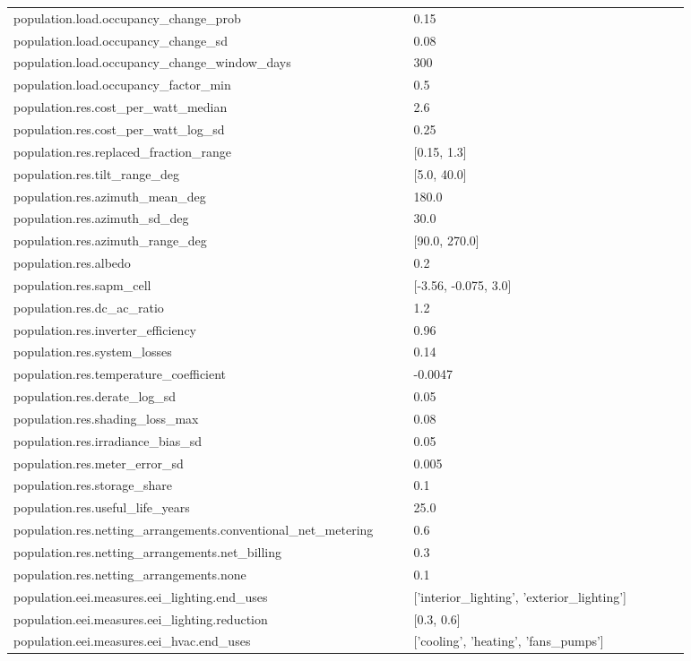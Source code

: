 \begin{longtable}{p{0.55\linewidth}p{0.38\linewidth}}
population.load.occupancy\_change\_prob & 0.15 \\
population.load.occupancy\_change\_sd & 0.08 \\
population.load.occupancy\_change\_window\_days & 300 \\
population.load.occupancy\_factor\_min & 0.5 \\
population.res.cost\_per\_watt\_median & 2.6 \\
population.res.cost\_per\_watt\_log\_sd & 0.25 \\
population.res.replaced\_fraction\_range & [0.15, 1.3] \\
population.res.tilt\_range\_deg & [5.0, 40.0] \\
population.res.azimuth\_mean\_deg & 180.0 \\
population.res.azimuth\_sd\_deg & 30.0 \\
population.res.azimuth\_range\_deg & [90.0, 270.0] \\
population.res.albedo & 0.2 \\
population.res.sapm\_cell & [-3.56, -0.075, 3.0] \\
population.res.dc\_ac\_ratio & 1.2 \\
population.res.inverter\_efficiency & 0.96 \\
population.res.system\_losses & 0.14 \\
population.res.temperature\_coefficient & -0.0047 \\
population.res.derate\_log\_sd & 0.05 \\
population.res.shading\_loss\_max & 0.08 \\
population.res.irradiance\_bias\_sd & 0.05 \\
population.res.meter\_error\_sd & 0.005 \\
population.res.storage\_share & 0.1 \\
population.res.useful\_life\_years & 25.0 \\
population.res.netting\_arrangements.conventional\_net\_metering & 0.6 \\
population.res.netting\_arrangements.net\_billing & 0.3 \\
population.res.netting\_arrangements.none & 0.1 \\
population.eei.measures.eei\_lighting.end\_uses & ['interior\_lighting', 'exterior\_lighting'] \\
population.eei.measures.eei\_lighting.reduction & [0.3, 0.6] \\
population.eei.measures.eei\_hvac.end\_uses & ['cooling', 'heating', 'fans\_pumps'] \\

\end{longtable}
